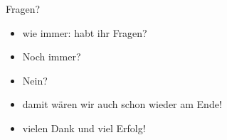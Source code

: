
\begin{frame}[fragile]{Fragen?}
    \begin{itemize}[<+->]
    \item wie immer: habt ihr Fragen?
    \item Noch immer?
    \item Nein?
    \item damit wären wir auch schon wieder am Ende!
    \item vielen Dank und viel Erfolg!
    \end{itemize}
\end{frame}



